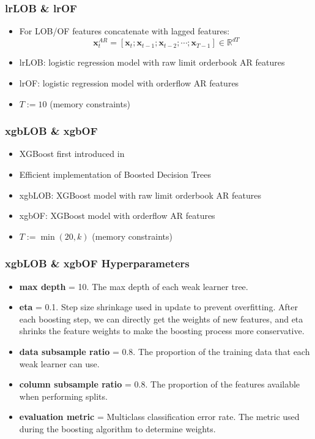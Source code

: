\documentclass[handout]{beamer}
\begin{document}
\begin{frame}
    \frametitle{lrLOB \& lrOF}
     \begin{itemize}
        \item For LOB/OF features concatenate with lagged features:
            \begin{equation}
                \bm{x}^{AR}_t = [\bm{x}_t; \bm{x}_{t-1}; \bm{x}_{t-2}; \cdots; \bm{x}_{T-1}] \in  \mathbb{R}^{dT}\label{AR_features}
            \end{equation}
        \item lrLOB: logistic regression model with raw limit orderbook AR features
        \item lrOF: logistic regression model with orderflow AR features
        \item $T := 10$ (memory constraints)
    \end{itemize}
    
\end{frame}

\begin{frame}
    \frametitle{xgbLOB \& xgbOF}
     \begin{itemize}
         \item XGBoost first introduced in {\color{blue}\cite{XGBOOST2016}}
        \item Efficient implementation of Boosted Decision Trees
        \item xgbLOB: XGBoost model with raw limit orderbook AR features
        \item xgbOF: XGBoost model with orderflow AR features
        \item $T := \min(20, k)$ (memory constraints)
    \end{itemize}
    
\end{frame}

\begin{frame}
    \frametitle{xgbLOB \& xgbOF Hyperparameters}
     \begin{itemize}
        \item \textbf{max depth} = 10. The max depth of each weak learner tree.
        \item \textbf{eta} = 0.1. Step size shrinkage used in update to prevent overfitting. After each boosting step, we can directly get the weights of new features, and eta shrinks the feature weights to make the boosting process more conservative.
        \item \textbf{data subsample ratio} = 0.8. The proportion of the training data that each weak learner can use.
        \item \textbf{column subsample ratio} = 0.8. The proportion of the features available when performing splits.
        \item \textbf{evaluation metric} = Multiclass classification error rate. The metric used during the boosting algorithm to determine weights.
    \end{itemize}
\end{frame}
\end{document}

